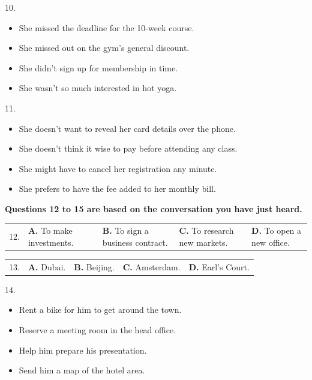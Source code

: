 \documentclass[UTF8,11pt]{ctexart}
\begin{document}
10.


\begin{itemize}[leftmargin=2em,itemsep=.2em,topsep=.4em]\item[A.] She missed the deadline for the 10-week course.
\item[B.] She missed out on the gym's general discount.
\item[C.] She didn't sign up for membership in time.
\item[D.] She wasn't so much interested in hot yoga.
\end{itemize}

11.


\begin{itemize}[leftmargin=2em,itemsep=.2em,topsep=.4em]\item[A.] She doesn't want to reveal her card details over the phone.
\item[B.] She doesn't think it wise to pay before attending any class.
\item[C.] She might have to cancel her registration any minute.
\item[D.] She prefers to have the fee added to her monthly bill.
\end{itemize}

\textbf{Questions 12 to 15 are based on the conversation you have just heard.}


\noindent\begin{tabularx}{\linewidth}{@{}lXXXX@{}}12. & \textbf{A.} To make investments. & \textbf{B.} To sign a business contract. & \textbf{C.} To research new markets. & \textbf{D.} To open a new office.\\\end{tabularx}\par

\noindent\begin{tabularx}{\linewidth}{@{}lXXXX@{}}13. & \textbf{A.} Dubai. & \textbf{B.} Beijing. & \textbf{C.} Amsterdam. & \textbf{D.} Earl's Court.\\\end{tabularx}\par

14.


\begin{itemize}[leftmargin=2em,itemsep=.2em,topsep=.4em]\item[A.] Rent a bike for him to get around the town.
\item[B.] Reserve a meeting room in the head office.
\item[C.] Help him prepare his presentation.
\item[D.] Send him a map of the hotel area.
\end{itemize}
\end{document}
